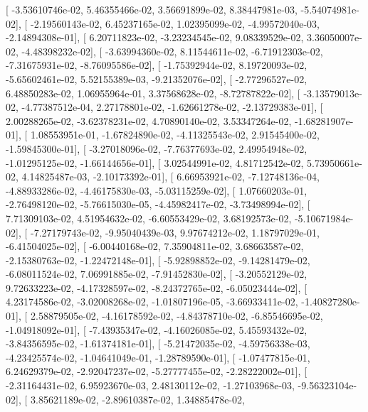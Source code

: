 \documentclass{article}
\begin{document}
       [ -3.53610746e-02,   5.46355466e-02,   3.56691899e-02,
          8.38447981e-03,  -5.54074981e-02],
       [ -2.19560143e-02,   6.45237165e-02,   1.02395099e-02,
         -4.99572040e-03,  -2.14894308e-01],
       [  6.20711823e-02,  -3.23234545e-02,   9.08339529e-02,
          3.36050007e-02,  -4.48398232e-02],
       [ -3.63994360e-02,   8.11544611e-02,  -6.71912303e-02,
         -7.31675931e-02,  -8.76095586e-02],
       [ -1.75392944e-02,   8.19720093e-02,  -5.65602461e-02,
          5.52155389e-03,  -9.21352076e-02],
       [ -2.77296527e-02,   6.48850283e-02,   1.06955964e-01,
          3.37568628e-02,  -8.72787822e-02],
       [ -3.13579013e-02,  -4.77387512e-04,   2.27178801e-02,
         -1.62661278e-02,  -2.13729383e-01],
       [  2.00288265e-02,  -3.62378231e-02,   4.70890140e-02,
          3.53347264e-02,  -1.68281907e-01],
       [  1.08553951e-01,  -1.67824890e-02,  -4.11325543e-02,
          2.91545400e-02,  -1.59845300e-01],
       [ -3.27018096e-02,  -7.76377693e-02,   2.49954948e-02,
         -1.01295125e-02,  -1.66144656e-01],
       [  3.02544991e-02,   4.81712542e-02,   5.73950661e-02,
          4.14825487e-03,  -2.10173392e-01],
       [  6.66953921e-02,  -7.12748136e-04,  -4.88933286e-02,
         -4.46175830e-03,  -5.03115259e-02],
       [  1.07660203e-01,  -2.76498120e-02,  -5.76615030e-05,
         -4.45982417e-02,  -3.73498994e-02],
       [  7.71309103e-02,   4.51954632e-02,  -6.60553429e-02,
          3.68192573e-02,  -5.10671984e-02],
       [ -7.27179743e-02,  -9.95040439e-03,   9.97674212e-02,
          1.18797029e-01,  -6.41504025e-02],
       [ -6.00440168e-02,   7.35904811e-02,   3.68663587e-02,
         -2.15380763e-02,  -1.22472148e-01],
       [ -5.92898852e-02,  -9.14281479e-02,  -6.08011524e-02,
          7.06991885e-02,  -7.91452830e-02],
       [ -3.20552129e-02,   9.72633223e-02,  -4.17328597e-02,
         -8.24372765e-02,  -6.05023444e-02],
       [  4.23174586e-02,  -3.02008268e-02,  -1.01807196e-05,
         -3.66933411e-02,  -1.40827280e-01],
       [  2.58879505e-02,  -4.16178592e-02,  -4.84378710e-02,
         -6.85546695e-02,  -1.04918092e-01],
       [ -7.43935347e-02,  -4.16026085e-02,   5.45593432e-02,
         -3.84356595e-02,  -1.61374181e-01],
       [ -5.21472035e-02,  -4.59756338e-03,  -4.23425574e-02,
         -1.04641049e-01,  -1.28789590e-01],
       [ -1.07477815e-01,   6.24629379e-02,  -2.92047237e-02,
         -5.27777455e-02,  -2.28222002e-01],
       [ -2.31164431e-02,   6.95923670e-03,   2.48130112e-02,
         -1.27103968e-03,  -9.56323104e-02],
       [  3.85621189e-02,  -2.89610387e-02,   1.34885478e-02,
\end{document}
